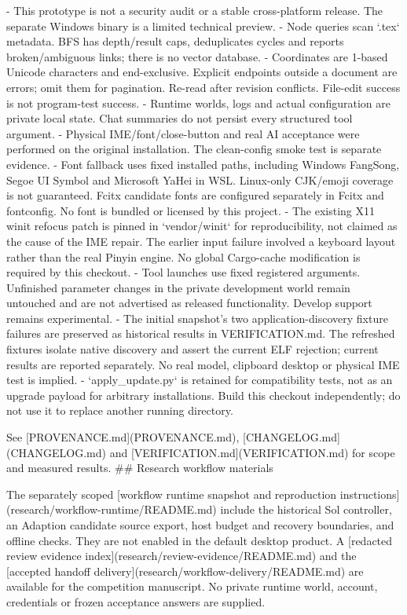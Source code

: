 - This prototype is not a security audit or a stable cross-platform release. The separate Windows binary is a limited technical preview.
- Node queries scan `.tex` metadata. BFS has depth/result caps, deduplicates
  cycles and reports broken/ambiguous links; there is no vector database.
- Coordinates are 1-based Unicode characters and end-exclusive. Explicit
  endpoints outside a document are errors; omit them for pagination. Re-read
  after revision conflicts. File-edit success is not program-test success.
- Runtime worlds, logs and actual configuration are private local state.
  Chat summaries do not persist every structured tool argument.
- Physical IME/font/close-button and real AI acceptance were performed on the
  original installation. The clean-config smoke test is separate evidence.
- Font fallback uses fixed installed paths, including Windows FangSong,
  Segoe UI Symbol and Microsoft YaHei in WSL. Linux-only CJK/emoji coverage
  is not guaranteed. Fcitx candidate fonts are configured separately in Fcitx
  and fontconfig. No font is bundled or licensed by this project.
- The existing X11 winit refocus patch is pinned in `vendor/winit` for
  reproducibility, not claimed as the cause of the IME repair. The earlier
  input failure involved a keyboard layout rather than the real Pinyin engine.
  No global Cargo-cache modification is required by this checkout.
- Tool launches use fixed registered arguments. Unfinished parameter changes
  in the private development world remain untouched and are not advertised as
  released functionality. Develop support remains experimental.
- The initial snapshot's two application-discovery fixture failures are preserved
  as historical results in VERIFICATION.md. The refreshed fixtures isolate native
  discovery and assert the current ELF rejection; current results are reported
  separately. No real model, clipboard desktop or physical IME test is implied.
- `apply_update.py` is retained for compatibility tests, not as an upgrade
  payload for arbitrary installations. Build this checkout independently;
  do not use it to replace another running directory.

See [PROVENANCE.md](PROVENANCE.md), [CHANGELOG.md](CHANGELOG.md) and
[VERIFICATION.md](VERIFICATION.md) for scope and measured results.
## Research workflow materials

The separately scoped [workflow runtime snapshot and reproduction instructions](research/workflow-runtime/README.md) include the historical Sol controller, an Adaption candidate source export, host budget and recovery boundaries, and offline checks. They are not enabled in the default desktop product. A [redacted review evidence index](research/review-evidence/README.md) and the [accepted handoff delivery](research/workflow-delivery/README.md) are available for the competition manuscript. No private runtime world, account, credentials or frozen acceptance answers are supplied.


